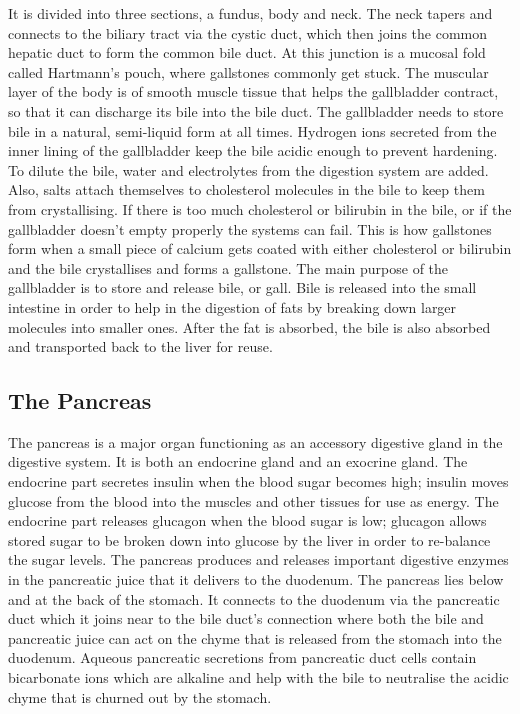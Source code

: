 It is divided into three sections, a fundus, body and neck. The neck tapers and connects to the biliary tract via the cystic duct, which then joins the common hepatic duct to form the common bile duct. At this junction is a mucosal fold called Hartmann's pouch, where gallstones commonly get stuck. The muscular layer of the body is of smooth muscle tissue that helps the gallbladder contract, so that it can discharge its bile into the bile duct. The gallbladder needs to store bile in a natural, semi-liquid form at all times. Hydrogen ions secreted from the inner lining of the gallbladder keep the bile acidic enough to prevent hardening. To dilute the bile, water and electrolytes from the digestion system are added. Also, salts attach themselves to cholesterol molecules in the bile to keep them from crystallising. If there is too much cholesterol or bilirubin in the bile, or if the gallbladder doesn't empty properly the systems can fail. This is how gallstones form when a small piece of calcium gets coated with either cholesterol or bilirubin and the bile crystallises and forms a gallstone. The main purpose of the gallbladder is to store and release bile, or gall. Bile is released into the small intestine in order to help in the digestion of fats by breaking down larger molecules into smaller ones. After the fat is absorbed, the bile is also absorbed and transported back to the liver for reuse.

\hypertarget{the-pancreas}{%
\subsection{The Pancreas}\label{the-pancreas}}

The pancreas is a major organ functioning as an accessory digestive gland in the digestive system. It is both an endocrine gland and an exocrine gland. The endocrine part secretes insulin when the blood sugar becomes high; insulin moves glucose from the blood into the muscles and other tissues for use as energy. The endocrine part releases glucagon when the blood sugar is low; glucagon allows stored sugar to be broken down into glucose by the liver in order to re-balance the sugar levels. The pancreas produces and releases important digestive enzymes in the pancreatic juice that it delivers to the duodenum. The pancreas lies below and at the back of the stomach. It connects to the duodenum via the pancreatic duct which it joins near to the bile duct's connection where both the bile and pancreatic juice can act on the chyme that is released from the stomach into the duodenum. Aqueous pancreatic secretions from pancreatic duct cells contain bicarbonate ions which are alkaline and help with the bile to neutralise the acidic chyme that is churned out by the stomach.



